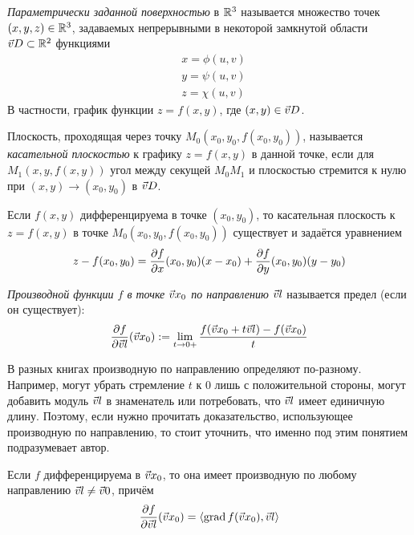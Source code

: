 \begin{multicols}{2}
\begin{definition}{}{}
	\textit{Параметрически заданной поверхностью} в $\mathbb{R}^3$ называется множество точек $(x, y, z) \in \mathbb{R}^3$, задаваемых непрерывными в некоторой замкнутой области $\vec{v}{D} \subset \mathbb{R}^2$ функциями
	\begin{align*}
		&{x = \phi(u, v)}
		\\
		&{y = \psi(u, v)}
		\\
		&{z = \chi(u, v)}
	\end{align*}
	В частности, график функции $z = f(x, y)$, где $(x, y) \in \vec{v}{D}$.
\end{definition}

\begin{definition}{}{}
	Плоскость, проходящая через точку $M_0(x_0, y_0, f(x_0, y_0))$, называется \textit{касательной плоскостью} к графику $z = f(x, y)$ в данной точке, если для $M_1(x, y, f(x, y))$ угол между секущей $M_0 M_1$ и плоскостью стремится к нулю при $(x, y) \to (x_0, y_0)$ в $\vec{v}{D}$.
\end{definition}

\begin{theorema}{}{}
	Если $f(x, y)$ дифференцируема в точке $(x_0, y_0)$, то касательная плоскость к $z = f(x, y)$ в точке $M_0(x_0, y_0, f(x_0, y_0))$ существует и задаётся уравнением
	\[
		z - f(x_0, y_0) = \frac{\partial f}{\partial x} (x_0, y_0) (x - x_0) + \frac{\partial f}{\partial y} (x_0, y_0) (y - y_0)
	\]
\end{theorema}


\begin{definition}{}{}
	\textit{Производной функции $f$ в точке $\vec{v}{x}_0$ по направлению} $\vec{v}{l}$ называется предел (если он существует):
	\[
		\frac{\partial f}{\partial \vec{v}{l}} (\vec{v}{x}_0) := \lim\limits_{t \to 0+} \dfrac{f(\vec{v}{x}_0 + t\vec{v}{l}) - f(\vec{v}{x}_0)}{t}
	\]
\end{definition}

\begin{note}{}{}
	В разных книгах производную по направлению определяют по-разному. Например, могут убрать стремление $t$ к 0 лишь с положительной стороны, могут добавить модуль $\vec{v}{l}$ в знаменатель или потребовать, что $\vec{v}{l}$ имеет единичную длину. Поэтому, если нужно прочитать доказательство, использующее производную по направлению, то стоит уточнить, что именно под этим понятием подразумевает автор.
\end{note}

\begin{proposition}{}{}
	Если $f$ дифференцируема в $\vec{v}{x}_0$, то она имеет производную по любому направлению $\vec{v}{l} \neq \vec{v}{0}$, причём
	\[
		\frac{\partial f}{\partial \vec{v}{l}} (\vec{v}{x}_0) = \left\langle\operatorname{grad} f(\vec{v}{x}_0), \vec{v}{l}\right\rangle
	\]
\end{proposition}


\end{multicols}
